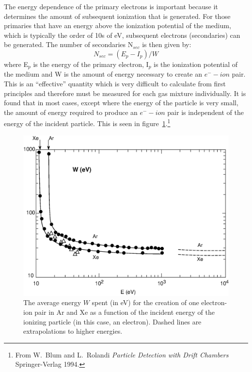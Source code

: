 \documentclass{article}
\begin{document}
The energy dependence of the primary electrons is important because
it determines the amount of subsequent ionization that is generated.
For those primaries that have an energy above the ionization potential 
of the medium, which is typically the order of 10s of eV, subsequent 
electrons (secondaries) can be generated.  The number of secondaries 
N$_{sec}$ is then given by:
\begin{equation}
        N_{sec} = (E_{p} - I_{p})/W
\label{eq:secondary}
\end{equation}
where E$_{p}$ is the energy of the primary electron, I$_{p}$ is the 
ionization potential of the medium and W is the amount of energy necessary
to create an $e^{-}-ion$ pair. This is an ``effective'' quantity
which is very difficult to calculate from first principles and therefore
must be measured for each gas mixture individually.  It is found
that in most cases, except where the energy of the particle is very
small, the amount of energy required to produce an $e^{-}-ion$ pair
is independent of the energy of the incident particle.  This is seen
in figure~\ref{fig:W}.\footnote{From W.~Blum and L.~Rolandi
  {\em Particle Detection with Drift Chambers} Springer-Verlag 1994.}
\begin{figure}[htb]
\begin{center}
\includegraphics[width=.55\textwidth]{./pics/W.eps}
\caption{The average energy $W$ spent (in eV) for the creation
  of one electron-ion pair in Ar and Xe as a function of the incident
  energy of the ionizing particle (in this case, an electron).
  Dashed lines are extrapolations to higher energies.}
\label{fig:W}
\end{center}
\end{figure}
\end{document}
